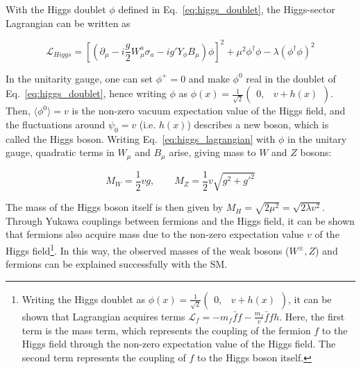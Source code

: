 With the Higgs doublet $\phi$ defined in Eq.~\ref{eq:higgs_doublet}, the Higgs-sector Lagrangian can be written as

\begin{equation}
    \mathcal{L}_{Higgs} = \left[ \left( \partial_{\mu} - i \frac{g}{2} W_{\mu}^{a} \sigma_{a} - ig' Y_{\phi} B_{\mu} \right) \phi \right]^{2} + \mu^2 \phi^{\dag} \phi - \lambda \left( \phi^{\dag} \phi \right)^{2}
    \label{eq:higgs_lagrangian}
\end{equation}

In the unitarity gauge, one can set $\phi^{+} = 0$ and make $\phi^{0}$ real in the doublet of Eq.~\ref{eq:higgs_doublet}, hence writing $\phi$ as
$\phi(x) = \frac{1}{\sqrt{2}} \begin{pmatrix} 0, & v + h(x) \end{pmatrix}$. 
Then, $\langle \phi^{0} \rangle = v$ is the non-zero vacuum expectation value of the Higgs field, and the fluctuations around $\psi_{0} = v$
(i.e. $h(x)$) describes a new boson, which is called the Higgs boson. Writing Eq.~\ref{eq:higgs_lagrangian} with $\phi$ in the unitary gauge, 
quadratic terms in $W_{\mu}$ and $B_{\mu}$ arise, giving mass to $W$ and $Z$ bosons:

\begin{equation}
    M_{W} = \frac{1}{2} v g, \qquad M_{Z} = \frac{1}{2} v \sqrt{g^2 + g'^{2}}
\end{equation}

The mass of the Higgs boson itself is then given by $M_{H} = \sqrt{2 \mu^2} = \sqrt{2 \lambda v^2}$. Through Yukawa couplings between fermions and the
Higgs field, it can be shown that fermions also acquire mass due to the non-zero expectation value $v$ 
of the Higgs field\footnote{Writing the Higgs doublet as $\phi(x) = \frac{1}{\sqrt{2}} \begin{pmatrix} 0, & v + h(x) \end{pmatrix}$, it can be shown that
Lagrangian acquires terms $\mathcal{L}_{f} = -m_{f} \bar{f} f - \frac{m_f}{v} \bar{f} f h $. Here, the first term is the mass term, which
represents the coupling of the fermion $f$ to the Higgs field through the non-zero expectation value of the Higgs field.
The second term represents the coupling of $f$ to the Higgs boson itself.}. In this way, the observed masses of the weak bosons ($W^{\pm}, Z$)
and fermions can be explained successfully with the SM.

